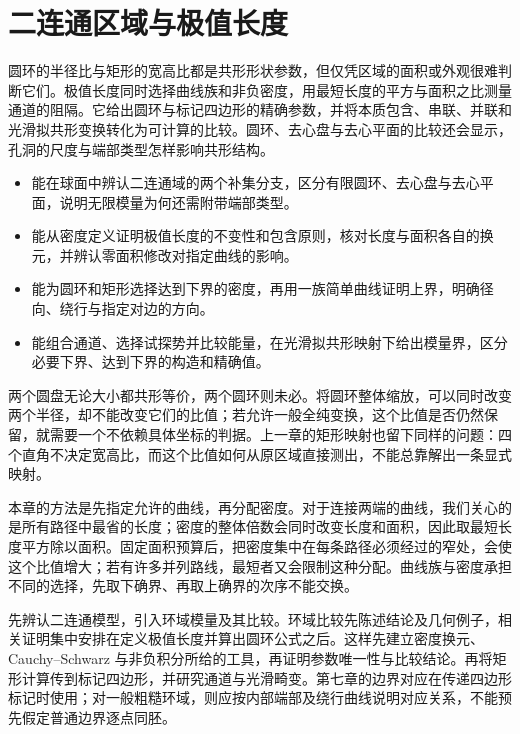 \chapter{二连通区域与极值长度}
\label{b3:ch:08}
\begin{chapterabstract}
圆环的半径比与矩形的宽高比都是共形形状参数，但仅凭区域的面积或外观很难判断它们。极值长度同时选择曲线族和非负密度，用最短长度的平方与面积之比测量通道的阻隔。它给出圆环与标记四边形的精确参数，并将本质包含、串联、并联和光滑拟共形变换转化为可计算的比较。圆环、去心盘与去心平面的比较还会显示，孔洞的尺度与端部类型怎样影响共形结构。
\end{chapterabstract}

\begin{learninggoals}
\begin{itemize}
\item\label{b3:item:08-goal-1}能在球面中辨认二连通域的两个补集分支，区分有限圆环、去心盘与去心平面，说明无限模量为何还需附带端部类型。
\item\label{b3:item:08-goal-2}能从密度定义证明极值长度的不变性和包含原则，核对长度与面积各自的换元，并辨认零面积修改对指定曲线的影响。
\item\label{b3:item:08-goal-3}能为圆环和矩形选择达到下界的密度，再用一族简单曲线证明上界，明确径向、绕行与指定对边的方向。
\item\label{b3:item:08-goal-4}能组合通道、选择试探势并比较能量，在光滑拟共形映射下给出模量界，区分必要下界、达到下界的构造和精确值。
\end{itemize}
\end{learninggoals}

两个圆盘无论大小都共形等价，两个圆环则未必。将圆环整体缩放，可以同时改变两个半径，却不能改变它们的比值；若允许一般全纯变换，这个比值是否仍然保留，就需要一个不依赖具体坐标的判据。上一章的矩形映射也留下同样的问题：四个直角不决定宽高比，而这个比值如何从原区域直接测出，不能总靠解出一条显式映射。

\ProseParagraphBreak

本章的方法是先指定允许的曲线，再分配密度。对于连接两端的曲线，我们关心的是所有路径中最省的长度；密度的整体倍数会同时改变长度和面积，因此取最短长度平方除以面积。固定面积预算后，把密度集中在每条路径必须经过的窄处，会使这个比值增大；若有许多并列路线，最短者又会限制这种分配。曲线族与密度承担不同的选择，先取下确界、再取上确界的次序不能交换。

\ProseParagraphBreak

先辨认二连通模型，引入环域模量及其比较。环域比较先陈述结论及几何例子，相关证明集中安排在定义极值长度并算出圆环公式之后。这样先建立密度换元、Cauchy--Schwarz 与非负积分所给的工具，再证明参数唯一性与比较结论。再将矩形计算传到标记四边形，并研究通道与光滑畸变。第七章的边界对应在传递四边形标记时使用；对一般粗糙环域，则应按内部端部及绕行曲线说明对应关系，不能预先假定普通边界逐点同胚。

